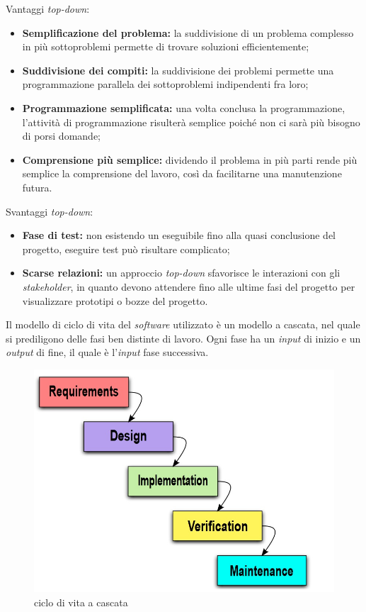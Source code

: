 Vantaggi \textit{top-down}:
\begin{itemize}
\item \textbf{Semplificazione del problema:} la suddivisione di un problema complesso in più sottoproblemi permette di trovare soluzioni efficientemente;
\item \textbf{Suddivisione dei compiti:} la suddivisione dei problemi permette una programmazione parallela dei sottoproblemi indipendenti fra loro;
\item \textbf{Programmazione semplificata:} una volta conclusa la programmazione, l'attività di programmazione risulterà semplice poiché non ci sarà più bisogno di porsi domande;
\item \textbf{Comprensione più semplice:} dividendo il problema in più parti rende più semplice la comprensione del lavoro, così da facilitarne una manutenzione futura.

\end{itemize}
 
Svantaggi \textit{top-down}:

\begin{itemize}

\item \textbf{Fase di test:} non esistendo un eseguibile fino alla quasi conclusione del progetto, eseguire test può risultare complicato;
\item \textbf{Scarse relazioni:} un approccio \textit{top-down} sfavorisce le interazioni con gli \textit{stakeholder}, in quanto devono attendere fino alle ultime fasi del progetto per visualizzare prototipi o bozze del progetto.
\end{itemize}

Il modello di ciclo di vita del \textit{software} utilizzato è un modello a cascata, nel quale si prediligono delle fasi ben distinte di lavoro. Ogni fase ha un \textit{input} di inizio e un \textit{output} di fine, il quale è l'\textit{input} fase successiva.

\begin{figure}[htbp]
	\includegraphics[scale=0.]{./capitoli/capitolo1/img/cascata}
	\caption{ciclo di vita a cascata}

\end{figure}

